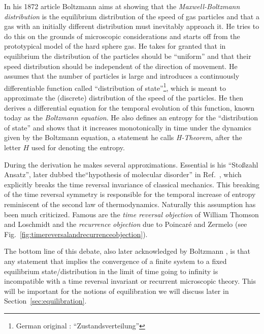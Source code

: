 \documentclass[a4paper,12pt,listof=totoc,index=totoc,bibliography=totoc,headsepline=false,headings=normal,BCOR16.153846mm,DIV12,headinclude,twoside,cleardoublepage=empty,numbers=noenddot,final]{scrreprt}
\theoremstyle{mystyle}
\numberwithin{equation}{section}
\numberwithin{figure}{section}
\numberwithin{lemma}{section}
\numberwithin{theorem}{section}
\numberwithin{corollary}{section}
\numberwithin{definition}{section}
\numberwithin{conjecture}{section}
\numberwithin{observation}{section}
\newcommand{\+}{\mkern2mu}
\DeclareMathOperator{\1}{\mathds{1}}
\begin{document}
In his 1872 article \cite{Boltzmann1872} Boltzmann aims at showing that the \emph{Maxwell-Boltzmann distribution} is the equilibrium distribution of the speed of gas particles and that a gas with an initially different distribution must inevitably approach it.
He tries to do this on the grounds of microscopic considerations and starts off from the prototypical model of the hard sphere gas.
He takes for granted that in equilibrium the distribution of the particles should be ``uniform'' and that their speed distribution should be independent of the direction of movement.
He assumes that the number of particles is large and introduces a continuously differentiable function called ``distribution of state''\footnote{German original \cite{Boltzmann1872}: \foreignlanguage{ngerman}{``Zustandsverteilung''}}, which is meant to approximate the (discrete) distribution of the speed of the particles.
He then derives a differential equation for the temporal evolution of this function, known today as the \emph{Boltzmann equation}.
He also defines an entropy for the ``distribution of state'' and shows that it increases monotonically in time under the dynamics given by the Boltzmann equation, a statement he calls \emph{H-Theorem}, after the letter $H$ used for denoting the entropy.

During the derivation he makes several approximations.
Essential is his ``Stoßzahl Ansatz'', later dubbed the``hypothesis of molecular disorder'' in Ref.~\cite{Boltzmann1896}, which explicitly breaks the time reversal invariance of classical mechanics.
This breaking of the time reversal symmetry is responsible for the  temporal increase of entropy reminiscent of the second law of thermodynamics.
Naturally this assumption has been much criticized. 
Famous are the \emph{time reversal objection} of William Thomson and Loschmidt and the \emph{recurrence objection} due to Poincar\'{e} and Zermelo \cite{Sklar1995} (see Fig.~\ref{fig:timereversalandrecurrenceobjection}).

The bottom line of this debate, also later acknowledged by Boltzmann \cite{Boltzmann1896a}, is that any statement that implies the convergence of a finite system to a fixed equilibrium state/distribution in the limit of time going to infinity is incompatible with a time reversal invariant or recurrent microscopic theory.
This will be important for the notions of equilibration we will discuss later in Section~\ref{sec:equilibration}.
\end{document}
